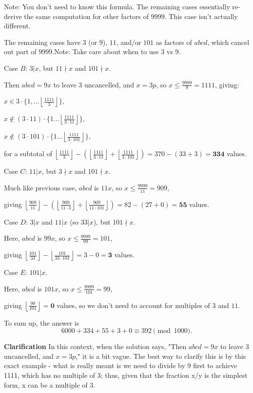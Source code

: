 \begin{enumerate}
 Note: You don't need to know this formula. The remaining cases essentially re-derive the same computation for other factors of $9999$. This case isn't actually different. 

 The remaining cases have $3$ (or $9$), $11$, and/or $101$ as factors of $abcd$, which cancel out part of $9999$.Note: Take care about when to use $3$ vs $9$.

 
Case $B$: $3|x$, but $11 \nmid x$ and $101 \nmid x$. 

 Then $abcd=9x$ to leave 3 uncancelled, and $x=3p$, so  $x \leq \frac{9999}{9} = 1111$, giving:

 $x \in 3 \cdot \{1, \dots \left\lfloor \frac{1111}{3}\right\rfloor\}$,

 $x \notin (3\cdot 11) \cdot \{1 \dots \left\lfloor \frac{1111}{3\cdot 11}\right\rfloor\}$,

 $x \notin (3 \cdot 101) \cdot \{1 \dots \left\lfloor \frac{1111}{3 \cdot 101}\right\rfloor\}$,

 for a subtotal of $\left\lfloor \frac{1111}{3}\right\rfloor -  (\left\lfloor\frac{1111}{3 \cdot 11}\right\rfloor + \left\lfloor\frac{1111}{3 \cdot 101}\right\rfloor ) = 370 - (33+3) = \textbf{334}$ values.

 
Case $C$: $11|x$, but $3 \nmid x$ and $101 \nmid x$. 

 Much like previous case, $abcd$ is $11x$, so  $x \leq \frac{9999}{11} = 909$,  

 giving $\left\lfloor \frac{909}{11}\right\rfloor -  \left(\left\lfloor\frac{909}{11 \cdot 3}\right\rfloor + \left\lfloor\frac{909}{11 \cdot 101}\right\rfloor \right) = 82 - (27 + 0) = \textbf{55}$ values.

 
Case $D$: $3|x$ and $11|x$ (so $33|x$), but $101 \nmid x$.  

 Here, $abcd$ is $99x$, so  $x \leq \frac{9999}{99} = 101$, 

 giving $\left\lfloor \frac{101}{33}\right\rfloor - \left\lfloor \frac{101}{33 \cdot 101}\right\rfloor = 3-0 = \textbf{3}$ values.

 
Case $E$: $101|x$.

 Here, $abcd$ is $101x$, so  $x \leq \frac{9999}{101} = 99$,

 giving $\left\lfloor \frac{99}{101}\right\rfloor = \textbf{0}$ values, so we don't need to account for multiples of $3$ and $11$. 

 To sum up, the answer is 
 \[6000+334+55+3+0\equiv\boxed{392} \pmod{1000}.\]

 \textbf{Clarification} In this context, when the solution says, "Then $abcd=9x$ to leave 3 uncancelled, and $x=3p$," it is a bit vague. The best way to clarify this is by this exact example - what is really meant is we need to divide by 9 first to achieve 1111, which has no multiple of 3; thus, given that the fraction x/y is the simplest form, x can be a multiple of 3.


\end{enumerate}
